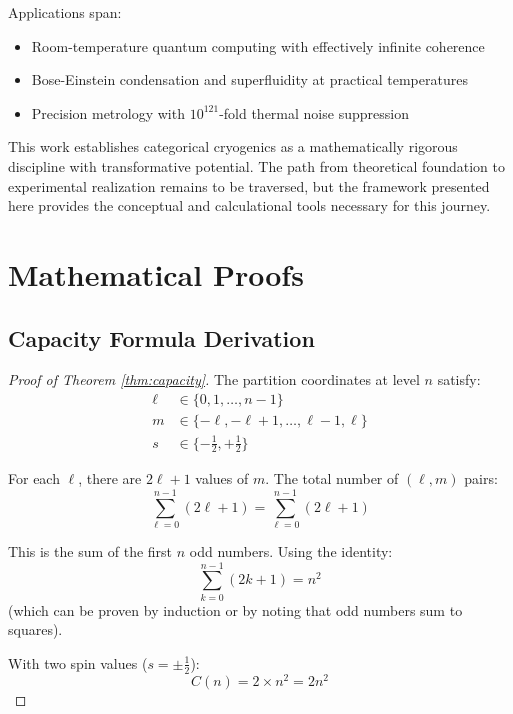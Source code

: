 \documentclass[twocolumn,10pt,twoside]{article}
\begin{document}
Applications span:
\begin{itemize}
    \item Room-temperature quantum computing with effectively infinite coherence
    \item Bose-Einstein condensation and superfluidity at practical temperatures
    \item Precision metrology with $10^{121}$-fold thermal noise suppression
\end{itemize}

This work establishes categorical cryogenics as a mathematically rigorous discipline with transformative potential. The path from theoretical foundation to experimental realization remains to be traversed, but the framework presented here provides the conceptual and calculational tools necessary for this journey.

\appendix

\section{Mathematical Proofs}

\subsection{Capacity Formula Derivation}

\begin{proof}[Proof of Theorem \ref{thm:capacity}]
The partition coordinates at level $n$ satisfy:
\begin{align}
\ell &\in \{0, 1, \ldots, n-1\} \\
m &\in \{-\ell, -\ell+1, \ldots, \ell-1, \ell\} \\
s &\in \{-\tfrac{1}{2}, +\tfrac{1}{2}\}
\end{align}

For each $\ell$, there are $2\ell + 1$ values of $m$. The total number of $(\ell, m)$ pairs:
\begin{equation}
\sum_{\ell=0}^{n-1} (2\ell + 1) = \sum_{\ell=0}^{n-1} (2\ell + 1)
\end{equation}

This is the sum of the first $n$ odd numbers. Using the identity:
\begin{equation}
\sum_{k=0}^{n-1} (2k + 1) = n^2
\end{equation}
(which can be proven by induction or by noting that odd numbers sum to squares).

With two spin values ($s = \pm\frac{1}{2}$):
\begin{equation}
C(n) = 2 \times n^2 = 2n^2
\end{equation}
\end{proof}
\end{document}
